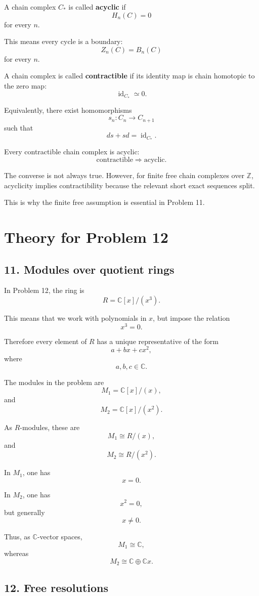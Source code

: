 \documentclass[12pt,a4paper]{article}
\theoremstyle{notespace}
\begin{document}
A chain complex \(C_*\) is called \textbf{acyclic} if
\[
H_n(C)=0
\]
for every \(n\).

This means every cycle is a boundary:
\[
Z_n(C)=B_n(C)
\]
for every \(n\).

A chain complex is called \textbf{contractible} if its identity map is chain homotopic to the zero map:
\[
\operatorname{id}_{C_*}\simeq 0.
\]

Equivalently, there exist homomorphisms
\[
s_n:C_n\to C_{n+1}
\]
such that
\[
ds+sd=\operatorname{id}_{C_*}.
\]

Every contractible chain complex is acyclic:
\[
\text{contractible}
\Longrightarrow
\text{acyclic}.
\]

The converse is not always true. However, for finite free chain complexes over \(\mathbb Z\), acyclicity implies contractibility because the relevant short exact sequences split.

This is why the finite free assumption is essential in Problem 11.

\section{Theory for Problem 12}

\subsection*{11. Modules over quotient rings}

In Problem 12, the ring is
\[
R=\mathbb C[x]/(x^3).
\]

This means that we work with polynomials in \(x\), but impose the relation
\[
x^3=0.
\]

Therefore every element of \(R\) has a unique representative of the form
\[
a+bx+cx^2,
\]
where
\[
a,b,c\in \mathbb C.
\]

The modules in the problem are
\[
M_1=\mathbb C[x]/(x),
\]
and
\[
M_2=\mathbb C[x]/(x^2).
\]

As \(R\)-modules, these are
\[
M_1\cong R/(x),
\]
and
\[
M_2\cong R/(x^2).
\]

In \(M_1\), one has
\[
x=0.
\]

In \(M_2\), one has
\[
x^2=0,
\]
but generally
\[
x\neq 0.
\]

Thus, as \(\mathbb C\)-vector spaces,
\[
M_1\cong \mathbb C,
\]
whereas
\[
M_2\cong \mathbb C\oplus \mathbb Cx.
\]

\subsection*{12. Free resolutions}
\end{document}
